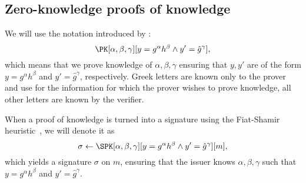 \subsection{Zero-knowledge proofs of knowledge}%
\label{ZKPK}

We will use the notation introduced by \citet{PKnotation}:
\begin{equation}\label{PKexample}
  \PK[\alpha, \beta, \gamma][y = g^\alpha h^\beta \land y' = \hat g^\gamma],
\end{equation}
which means that we prove knowledge of \(\alpha, \beta, \gamma\) ensuring that \(y, y'\) are of the form \(y = g^\alpha h^\beta\) and \(y' = \hat g^\gamma\), respectively.
Greek letters are known only to the prover and use for the information for which the prover wishes to prove knowledge, all other letters are known by the verifier.

When a proof of knowledge is turned into a signature using the Fiat-Shamir heuristic~\cite{FiatShamirHeuristic}, we will denote it as
\begin{equation*}\label{SPKexample}
  \sigma\gets \SPK[\alpha, \beta, \gamma]%
  [y = g^\alpha h^\beta \land y' = \hat g^\gamma]%
  [m],
\end{equation*}
which yields a signature \(\sigma\) on \(m\), ensuring that the issuer knows \(\alpha, \beta, \gamma\) such that \(y = g^\alpha h^\beta\) and \(y' = \hat{g}^\gamma\).


